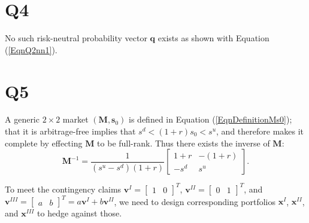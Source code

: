 \documentclass[final,3p,times]{elsarticle}
\begin{document}
\section{Q4}
	No such risk-neutral probability vector $\mathbf{q}$ exists as shown with Equation (\ref{EqnQ2nn1}).
	
\section{Q5}
	A generic $2\times2$ market $\left(\mathbf{M},\mathbf{s}_0\right)$ is defined in Equation (\ref{EqnDefinitionMs0}); that it is arbitrage-free implies that $s^d<\left(1+r\right)s_0<s^u$, and therefore makes it complete by effecting $\mathbf{M}$ to be full-rank. Thus there exists the inverse of $\mathbf{M}$:
	\begin{equation}
		\mathbf{M}^{-1}=\frac{1}{\left(s^u-s^d\right)\left(1+r\right)}
		\begin{bmatrix} 1+r & -\left(1+r\right) \\ -s^d & s^u \end{bmatrix}
		.
	\end{equation}
	
	To meet the contingency claims $\mathbf{v}^{I}=\begin{bmatrix} 1 & 0\end{bmatrix}^T$, $\mathbf{v}^{II}=\begin{bmatrix} 0 & 1\end{bmatrix}^T$, and $\mathbf{v}^{III}=\begin{bmatrix} a & b \end{bmatrix}^T=a\mathbf{v}^{I}+b\mathbf{v}^{II}$, we need to design corresponding portfolios $\mathbf{x}^{I}$, $\mathbf{x}^{II}$, and $\mathbf{x}^{III}$ to hedge against those.
	
\end{document}
